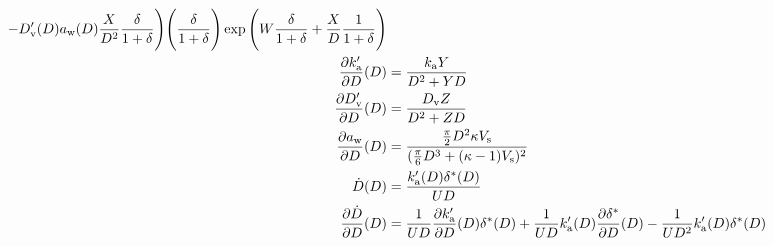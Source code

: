 \documentclass{article}
\begin{document}
\begin{align}
  - D_{\rm v}'(D) a_{\rm w}(D) \frac{X}{D^2} \frac{\delta}{1 + \delta} \Biggr)
  \Biggl(\frac{\delta}{1+\delta}\Biggr)
  \exp{\Biggl(W \frac{\delta}{1+\delta} + \frac{X}{D} \frac{1}{1+\delta}\Biggr)} \\
  \frac{\partial k_{\rm a}'}{\partial D}(D) &= \frac{k_{\rm a} Y}{D^2 + Y D} \\
  \frac{\partial D_{\rm v}'}{\partial D}(D) &= \frac{D_{\rm v} Z}{D^2 + Z D} \\
  \frac{\partial a_{\rm w}}{\partial D}(D) &= \frac{\frac{\pi}{2}D^2 \kappa V_{\rm s}}{(\frac{\pi}{6}D^3 + (\kappa - 1) V_{\rm s})^2} \\
  \dot{D}(D) &= \frac{k_{\rm a}'(D) \delta^*(D)}{U D} \\
  \frac{\partial \dot{D}}{\partial D}(D) &=
\frac{1}{U D} 
\frac{\partial k_{\rm a}'}{\partial D}(D) \delta^*(D)
+ \frac{1}{U D} k_{\rm a}'(D) \frac{\partial \delta^*}{\partial D}(D)
- \frac{1}{U D^2} k_{\rm a}'(D) \delta^*(D)
\end{align}
\end{document}
